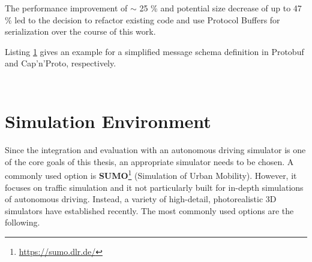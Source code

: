 The performance improvement of $\sim$ 25 \% and potential size decrease of up to 47 \% led to the decision to refactor existing code and use Protocol Buffers for serialization over the course of this work.

Listing \ref{lst:serialization_schema_examples} gives an example for a simplified message schema definition in Protobuf and Cap'n'Proto, respectively.

\begin{figure}[!h]
	\begin{minipage}{0.5\textwidth}
		\centering
		\inputminted[fontsize=\footnotesize]{text}{97_listings/protobuf_snippet.proto}
	\end{minipage}
	\begin{minipage}{0.5\textwidth}
		\centering
		\inputminted[fontsize=\footnotesize]{text}{97_listings/capnp_snippet.capnp}
	\end{minipage}
	\label{lst:serialization_schema_examples}
\end{figure}

\section{Simulation Environment}
\label{sec:implementation:simulation_environment}
Since the integration and evaluation with an autonomous driving simulator is one of the core goals of this thesis, an appropriate simulator needs to be chosen. A commonly used option is \textbf{SUMO}\footnote{\url{https://sumo.dlr.de/}} (Simulation of Urban Mobility). However, it focuses on traffic simulation and it not particularly built for in-depth simulations of autonomous driving. Instead, a variety of high-detail, photorealistic 3D simulators have established recently. The most commonly used options are the following.


